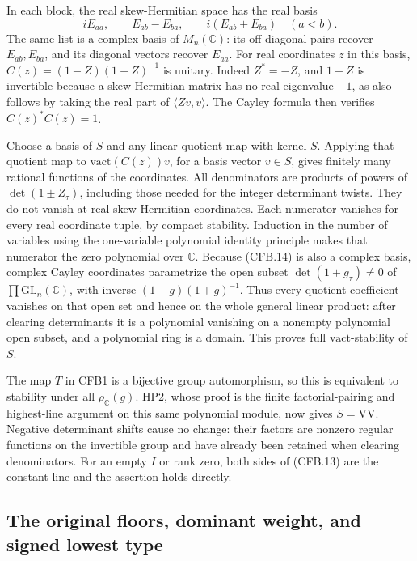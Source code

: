 In each block, the real skew-Hermitian space has the real basis
\[
 iE_{aa},\qquad E_{ab}-E_{ba},\qquad
                    i(E_{ab}+E_{ba})\quad(a<b).
                                                               \tag{CFB.14}
\]
The same list is a complex basis of \(M_n(\mathbb C)\): its
off-diagonal pairs recover \(E_{ab},E_{ba}\), and its diagonal
vectors recover \(E_{aa}\).  For real coordinates \(z\) in this
basis, \(C(z)=(1-Z)(1+Z)^{-1}\) is unitary.  Indeed \(Z^*=-Z\),
and \(1+Z\) is invertible because a skew-Hermitian matrix has no
real eigenvalue \(-1\), as also follows by taking the real part
of \(\langle Zv,v\rangle\).  The Cayley formula then verifies
\(C(z)^*C(z)=1\).

Choose a basis of \(S\) and any linear quotient map with kernel
\(S\).  Applying that quotient map to
\(\mathrm{vact}(C(z))v\), for a basis vector \(v\in S\), gives
finitely many rational functions of the coordinates.  All
denominators are products of powers of \(\det(1\pm Z_\tau)\),
including those needed for the integer determinant twists.
They do not vanish at real skew-Hermitian coordinates.  Each
numerator vanishes for every real coordinate tuple, by compact
stability.  Induction in the number of variables using the
one-variable polynomial identity principle makes that numerator
the zero polynomial over \(\mathbb C\).
Because (CFB.14) is also a complex basis, complex Cayley coordinates
parametrize the open subset \(\det(1+g_\tau)\ne0\) of
\(\prod\mathrm{GL}_n(\mathbb C)\), with inverse
\((1-g)(1+g)^{-1}\).  Thus every quotient coefficient vanishes
on that open set and hence on the whole general linear product:
after clearing determinants it is a polynomial vanishing on a
nonempty polynomial open subset, and a polynomial ring is a domain.
This proves full \(\mathrm{vact}\)-stability of \(S\).

The map \(T\) in CFB1 is a bijective group automorphism, so this
is equivalent to stability under all \(\rho_{\mathbb C}(g)\).
HP2, whose proof is the finite factorial-pairing and highest-line
argument on this same polynomial module, now gives
\(S=\mathrm{VV}\).  Negative determinant shifts cause no change:
their factors are nonzero regular functions on the invertible
group and have already been retained when clearing denominators.
For an empty \(I\) or rank zero, both sides of (CFB.13) are the
constant line and the assertion holds directly.

\subsection*{The original floors, dominant weight, and signed lowest type}

